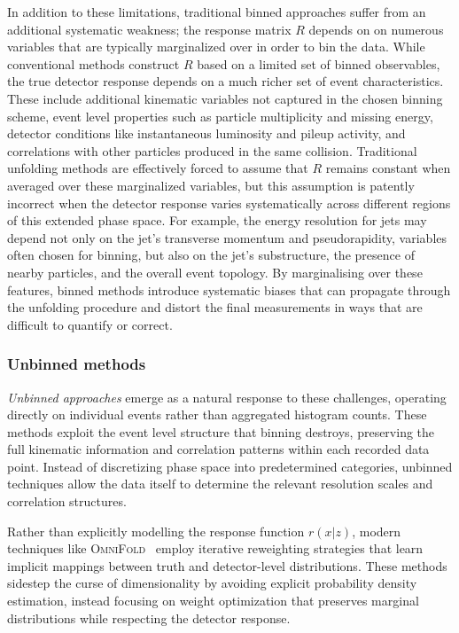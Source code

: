             In addition to these limitations, traditional binned approaches suffer from an additional systematic weakness;
            the response matrix \(R\) depends on on numerous variables that are typically marginalized over in order to bin the data.
            While conventional methods construct \(R\) based on a limited set of binned observables, the true detector response depends on a much richer set of event characteristics.
            These include additional kinematic variables not captured in the chosen binning scheme, event level properties such as particle multiplicity and missing energy, detector conditions like instantaneous luminosity and pileup activity, and correlations with other particles produced in the same collision.
            Traditional unfolding methods are effectively forced to assume that \(R\) remains constant when averaged over these marginalized variables, but this assumption is patently incorrect when the detector response varies systematically across different regions of this extended phase space.
            For example, the energy resolution for jets may depend not only on the jet's transverse momentum and pseudorapidity, variables often chosen for binning, but also on the jet's substructure, the presence of nearby particles, and the overall event topology.
            By marginalising over these features, binned methods introduce systematic biases that can propagate through the unfolding procedure and distort the final measurements in ways that are difficult to quantify or correct.

        \subsubsection{Unbinned methods}
        \emph{Unbinned approaches} emerge as a natural response to these challenges, operating directly on individual events rather than aggregated histogram counts.
        These methods exploit the event level structure that binning destroys, preserving the full kinematic information and correlation patterns within each recorded data point.
        Instead of discretizing phase space into predetermined categories, unbinned techniques allow the data itself to determine the relevant resolution scales and correlation structures.
        
        Rather than explicitly modelling the response function \(r(x|z)\), modern techniques like \textsc{OmniFold}~\cite{andreassen_omnifold_2020} employ iterative reweighting strategies that learn implicit mappings between truth and detector-level distributions.
        These methods sidestep the curse of dimensionality by avoiding explicit probability density estimation, instead focusing on weight optimization that preserves marginal distributions while respecting the detector response.


